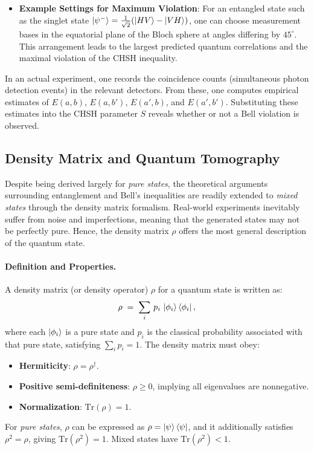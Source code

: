 \begin{itemize}
    \item \textbf{Example Settings for Maximum Violation}: For an entangled state such as the singlet state $\ket{\psi^-}=\frac{1}{\sqrt{2}}(\ket{HV}-\ket{VH})$, one can choose measurement bases in the equatorial plane of the Bloch sphere at angles differing by $45^\circ$. This arrangement leads to the largest predicted quantum correlations and the maximal violation of the CHSH inequality.
\end{itemize}

\noindent
In an actual experiment, one records the coincidence counts (simultaneous photon detection events) in the relevant detectors. From these, one computes empirical estimates of $E(a,b)$, $E(a,b')$, $E(a',b)$, and $E(a',b')$. Substituting these estimates into the CHSH parameter $S$ reveals whether or not a Bell violation is observed.

\subsection{Density Matrix and Quantum Tomography}
\label{subsec:tomography}
Despite being derived largely for \emph{pure states}, the theoretical arguments surrounding entanglement and Bell's inequalities are readily extended to \emph{mixed states} through the density matrix formalism. Real-world experiments inevitably suffer from noise and imperfections, meaning that the generated states may not be perfectly pure. Hence, the density matrix $\rho$ offers the most general description of the quantum state.

\paragraph{Definition and Properties.}
A density matrix (or density operator) $\rho$ for a quantum state is written as:
\[
\rho \;=\; \sum_i \,p_i\,\ket{\phi_i}\bra{\phi_i},
\]
where each $\ket{\phi_i}$ is a pure state and $p_i$ is the classical probability associated with that pure state, satisfying $\sum_i p_i=1$. The density matrix must obey:
\begin{itemize}
    \item \textbf{Hermiticity}: $\rho = \rho^\dagger$. 
    \item \textbf{Positive semi-definiteness}: $\rho \ge 0$, implying all eigenvalues are nonnegative.
    \item \textbf{Normalization}: $\mathrm{Tr}(\rho) = 1$.
\end{itemize}
For \emph{pure states}, $\rho$ can be expressed as $\rho=\ket{\psi}\bra{\psi}$, and it additionally satisfies $\rho^2=\rho$, giving $\mathrm{Tr}(\rho^2)=1$. Mixed states have $\mathrm{Tr}(\rho^2) <1$.

